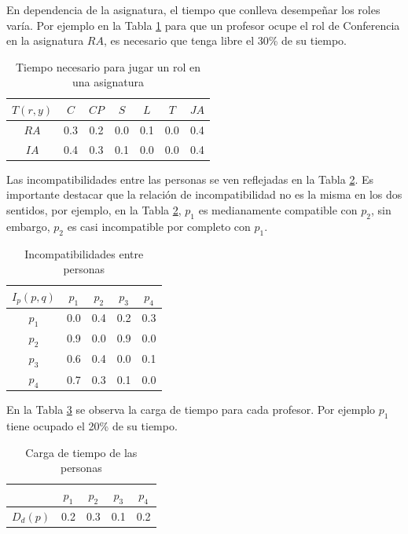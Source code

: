 En dependencia de la asignatura, el tiempo que conlleva desempeñar los roles varía. Por ejemplo en la Tabla \ref{tr-carga} para que un profesor ocupe el rol de Conferencia en la asignatura $RA$, es necesario que tenga libre el 30\% de su tiempo.

\begin{table}[H]
	\centering
	\caption{Tiempo necesario para jugar un rol en una asignatura}\label{tr-carga}
	\begin{tabular}{|c|c|c|c|c|c|c|}
		\hline
		$T(r,y)$ & $C$ & $CP$ & $S$ & $L$ & $T$ & $JA$   \\ \hline
		$RA$    & 0.3 &  0.2 & 0.0 & 0.1 & 0.0  & 0.4  \\ \hline
		$IA$     & 0.4 &  0.3 & 0.1 & 0.0 & 0.0  & 0.4  \\ \hline
	\end{tabular}
\end{table}

Las incompatibilidades entre las personas se ven reflejadas en la Tabla \ref{iep-carga}. Es importante destacar que la relación de incompatibilidad no es la misma en los dos sentidos, por ejemplo, en la Tabla \ref{iep-carga}, $ p_1 $ es medianamente compatible con $ p_2 $, sin embargo, $ p_2 $ es casi incompatible por completo con $ p_1 $.

\begin{table}[H]
	\centering
	\caption{Incompatibilidades entre personas}\label{iep-carga}
	\begin{tabular}{|c|c|c|c|c|}
		\hline
		$I_p(p,q)$ & $p_1$& $p_2$& $p_3$& $p_4$ \\ \hline
		$p_1$  	   & 0.0  &  0.4 & 0.2  &  0.3 \\ \hline
		$p_2$ 	   & 0.9  &  0.0 & 0.9  &  0.0 \\ \hline
		$p_3$      & 0.6  &  0.4 & 0.0  &  0.1 \\ \hline
		$p_4$ 	   & 0.7  &  0.3 & 0.1  &  0.0 \\ \hline
	\end{tabular}
\end{table}

En la Tabla \ref{tp-carga} se observa la carga de tiempo para cada profesor. Por ejemplo $ p_1 $ tiene ocupado el 20\% de su tiempo.

\begin{table}[H]
	\centering
	\caption{Carga de tiempo de las personas}\label{tp-carga}
	\begin{tabular}{|c|c|c|c|c|}
		\cline{2-5}
		\multicolumn{1}{c|}{}& $p_1$ & $p_2$ & $p_3$  & $p_4$ \\ \hline
		$D_d(p)$    & 0.2 & 0.3 & 0.1 & 0.2 \\ \hline
	\end{tabular}
\end{table}

